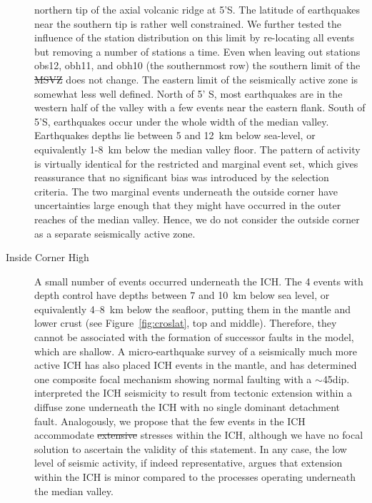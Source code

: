 \documentclass[jgr]{agu2001}
\newlength{\tw}
\providecommand{\DIFadd}[1]{{\protect\color{blue}\uwave{#1}}} %
\providecommand{\DIFdel}[1]{{\protect\color{red}\sout{#1}}}                      %
\providecommand{\DIFaddbegin}{} %
\providecommand{\DIFaddend}{} %
\providecommand{\DIFdelbegin}{} %
\providecommand{\DIFdelend}{} %
\begin{document}
\begin{article}
\begin{description}
northern tip of the axial volcanic ridge at 5'S.  The latitude
of earthquakes near the southern tip is rather well constrained.  We
further tested the influence of the station distribution on this limit
by re-locating all events but removing a number of stations a time.
Even when leaving out stations obs12, obh11, and obh10 (the
southernmost row) the southern limit of the \DIFdelbegin \DIFdel{MSVZ
}\DIFdelend \DIFaddbegin \DIFadd{MVSZ
}\DIFaddend does not change.  The eastern limit of the seismically active zone is
somewhat less well defined.  North of 5' S, most earthquakes are
in the western half of the valley with a few events near the eastern
flank.  South of  5'S, earthquakes occur under the whole
width of the median valley. Earthquakes depths lie between 5 and 12~km
below sea-level, or equivalently 1-8~km below the median valley floor.  The pattern
of activity is virtually identical for the restricted and marginal
event set, which gives reassurance that no significant bias was
introduced by the selection criteria.
  The two marginal events
underneath the outside corner have uncertainties large enough that
they might have occurred in the outer reaches of the median valley. Hence, we
do not consider the outside corner as a separate seismically
active zone.

\item[Inside Corner High]  A small number of events occurred
underneath the ICH.  The  4 events with depth control have depths
between 7 and 10~km below sea level, or equivalently 4--8~km
below the seafloor, putting them in the mantle and lower
crust (see Figure~\ref{fig:croslat}, top and middle). 
Therefore, they cannot be associated with the formation of successor
faults in the \citet{tucholke94} model, which are shallow.
A micro-earthquake survey of a  seismically much more active ICH
\citep[at 29\dg N,][]{wolfe95} has also placed ICH events in the
mantle, and has determined one composite focal mechanism showing
normal faulting with a $\sim$45\dg dip.  \citet{wolfe95} interpreted the ICH
seismicity to result from tectonic extension within a
diffuse zone underneath the ICH with no single dominant detachment
fault.  Analogously, we propose that the few events in the ICH
accommodate \DIFdelbegin \DIFdel{extensive }\DIFdelend \DIFaddbegin \DIFadd{tensile }\DIFaddend stresses within the ICH, although we have no focal solution to
ascertain the validity of this statement.  In any case, the low level
of seismic activity, if indeed representative, argues that extension
within the ICH is minor compared to the processes operating underneath the
median valley.


\end{description}
\end{article}
\end{document}
